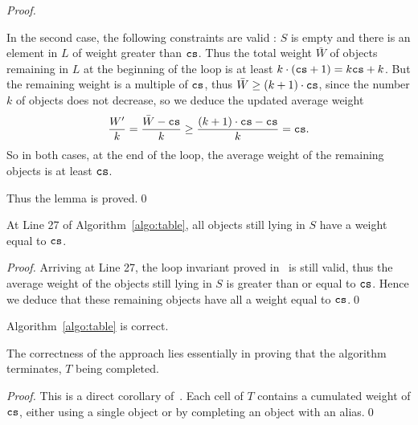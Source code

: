 \begin{proof}
\begin{itemize}
            In the second case, the following constraints are valid : $S$ is empty and there is an element in $L$
            of weight greater than $\texttt{cs}$.
            Thus the total weight $\bar{W}$ of objects remaining in $L$ at the beginning of the loop is at least $k\cdot (\texttt{cs} + 1) = k\texttt{cs} + k$.
            But the remaining weight is a multiple of $\texttt{cs}$, thus $\bar{W} \geq (k+1) \cdot \texttt{cs}$,
            since the number $k$ of objects does not decrease, so we deduce the updated average weight
            \[
                \frac{W'}{k} = \frac{\bar{W} - \texttt{cs}}{k} \geq \frac{(k+1)\cdot \texttt{cs} - \texttt{cs}}{k}  = \texttt{cs}.
            \]
            So in both cases, at the end of the loop, the average weight of the remaining objects is at least $\texttt{cs}$.
    \end{itemize}
    Thus the lemma is proved.\qed
\end{proof}
\begin{lemma}
\label{lem:res_without aliases}
    At Line 27 of Algorithm~\ref{algo:table}, all objects still lying in $S$ have a weight equal to $\texttt{cs}$.
\end{lemma}
\begin{proof}
    Arriving at Line 27, the loop invariant proved in~ is still valid, thus the 
    average weight of the objects still lying in $S$ is greater than or equal to $\texttt{cs}$.
    Hence we deduce that these remaining objects have all a weight equal to $\texttt{cs}$.\qed
\end{proof}


\begin{theorem}
\label{theo:correctness}
    Algorithm~\ref{algo:table} is correct.
\end{theorem}
The correctness of the approach lies essentially in proving that the algorithm terminates, $T$ being completed.
\begin{proof}
    This is a direct corollary of~. Each cell of $T$ contains
    a cumulated weight of $\texttt{cs}$, either using a single object or by completing an object with an alias.\qed
\end{proof}




